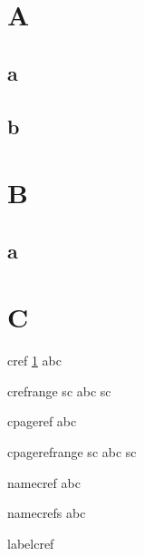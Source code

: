 \documentclass[11pt]{article}
\begin{document}
\section{A}
\label{sa}

\subsection{a}
\label{ssaa}

\subsection{b}
\label{ssab}

\section{B}
\label{sb}

\subsection{a}
\label{ssba}

\section{C}
\label{sc}

cref
\cref{sa}
abc 

crefrange
 {sc}
abc  {sc}

cpageref
abc 

cpagerefrange
 {sc}
abc  {sc}

namecref
abc 

namecrefs
abc 

labelcref
\end{document}
